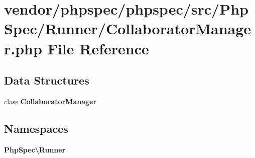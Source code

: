 \section{vendor/phpspec/phpspec/src/\+Php\+Spec/\+Runner/\+Collaborator\+Manager.php File Reference}
\label{_collaborator_manager_8php}
\subsection*{Data Structures}
\begin{DoxyCompactItemize}
\item 
class {\bf Collaborator\+Manager}
\end{DoxyCompactItemize}
\subsection*{Namespaces}
\begin{DoxyCompactItemize}
\item 
 {\bf Php\+Spec\textbackslash{}\+Runner}
\end{DoxyCompactItemize}
